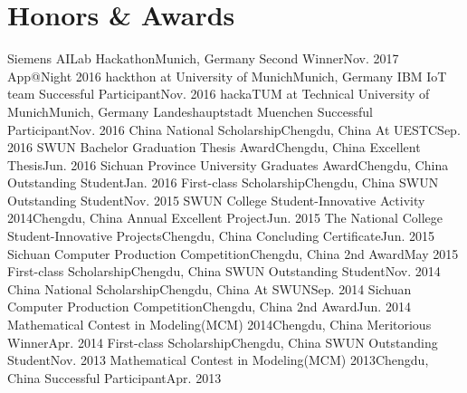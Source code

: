 \section{\textbf{Honors \& Awards}}
  \resumeSubHeadingListStart
  \resumeSubheading
        {Siemens AILab Hackathon}{Munich, Germany}
        {Second Winner}{Nov. 2017}
    \resumeSubheading
        {App@Night 2016 hackthon at University of Munich}{Munich, Germany}
        {IBM IoT team Successful Participant}{Nov. 2016}
    \resumeSubheading
        {hackaTUM at Technical University of Munich}{Munich, Germany}
        {Landeshauptstadt Muenchen Successful Participant}{Nov. 2016}
    \resumeSubheading
        {China National Scholarship}{Chengdu, China}
        {At UESTC}{Sep. 2016}
    \resumeSubheading
        {SWUN Bachelor Graduation Thesis Award}{Chengdu, China}
        {Excellent Thesis}{Jun. 2016}
    \resumeSubheading
        {Sichuan Province University Graduates Award}{Chengdu, China}
        {Outstanding Student}{Jan. 2016}
    \resumeSubheading
        {First-class Scholarship}{Chengdu, China}
        {SWUN Outstanding Student}{Nov. 2015}
    \resumeSubheading
        {SWUN College Student-Innovative Activity 2014}{Chengdu, China}
        {Annual Excellent Project}{Jun. 2015}
    \resumeSubheading
        {The National College Student-Innovative Projects}{Chengdu, China}
        {Concluding Certificate}{Jun. 2015}
    \resumeSubheading
        {Sichuan Computer Production Competition}{Chengdu, China}
        {2nd Award}{May 2015}
    \resumeSubheading
        {First-class Scholarship}{Chengdu, China}
        {SWUN Outstanding Student}{Nov. 2014}
    \resumeSubheading
        {China National Scholarship}{Chengdu, China}
        {At SWUN}{Sep. 2014}
    \resumeSubheading
        {Sichuan Computer Production Competition}{Chengdu, China}
        {2nd Award}{Jun. 2014}
    \resumeSubheading
        {Mathematical Contest in Modeling(MCM) 2014}{Chengdu, China}
        {Meritorious Winner}{Apr. 2014}
    \resumeSubheading
        {First-class Scholarship}{Chengdu, China}
        {SWUN Outstanding Student}{Nov. 2013}
    \resumeSubheading
        {Mathematical Contest in Modeling(MCM) 2013}{Chengdu, China}
        {Successful Participant}{Apr. 2013}
  \resumeSubHeadingListEnd